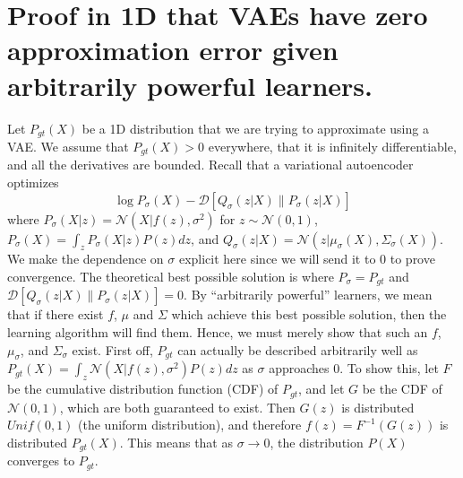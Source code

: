 \documentclass[a4paper, 11pt]{article} %
\begin{document}
\appendix
\section{Proof in 1D that VAEs have zero approximation error given arbitrarily powerful learners.}
\label{appendix:convergence}
Let $P_{gt}(X)$ be a 1D distribution that we are trying to approximate using a VAE.
We assume that $P_{gt}(X)>0$ everywhere, that it is infinitely differentiable, and all the derivatives are bounded.
Recall that a variational autoencoder optimizes
\begin{equation}
 \log P_\sigma(X)-\mathcal{D}[Q_\sigma(z|X)\|P_\sigma(z|X)]
\end{equation}
where $P_\sigma(X|z)=\mathcal{N}(X|f(z),\sigma^2)$ for $z\sim \mathcal{N}(0,1)$, $P_\sigma(X)=\int_z P_\sigma(X|z) P(z) dz$, and $Q_\sigma(z|X)=\mathcal{N}(z|\mu_\sigma(X),\Sigma_\sigma(X))$.
We make the dependence on $\sigma$ explicit here since we will send it to 0 to prove convergence.
The theoretical best possible solution is where $P_\sigma=P_{gt}$ and $\mathcal{D}[Q_\sigma(z|X)\|P_\sigma(z|X)]=0$.
By ``arbitrarily powerful'' learners, we mean that if there exist $f$, $\mu$ and $\Sigma$ which achieve this best possible solution, then the learning algorithm will find them.
Hence, we must merely show that such an $f$, $\mu_\sigma$, and $\Sigma_\sigma$ exist.
First off, $P_{gt}$ can actually be described arbitrarily well as $P_{gt}(X)=\int_z\mathcal{N}(X|f(z),\sigma^2) P(z) dz$ as $\sigma$ approaches 0.  
To show this, let $F$ be the cumulative distribution function (CDF) of $P_{gt}$, and let $G$ be the CDF of $\mathcal{N}(0,1)$, which are both guaranteed to exist.  
Then $G(z)$ is distributed $Unif(0,1)$ (the uniform distribution), and therefore $f(z)=F^{-1}(G(z))$ is distributed $P_{gt}(X)$.  
This means that as $\sigma\rightarrow 0$, the distribution $P(X)$ converges to $P_{gt}$.
\end{document}

